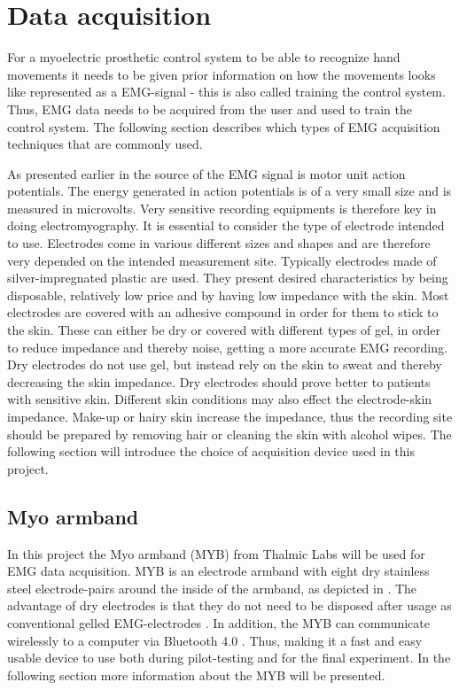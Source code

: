 \section{Data acquisition} \label{sec:BG:dataAcquisition}
For a myoelectric prosthetic control system to be able to recognize hand movements it needs to be given prior information on how the movements looks like represented as a EMG-signal - this is also called training the control system. Thus, EMG data needs to be acquired from the user and used to train the control system. The following section describes which types of EMG acquisition techniques that are commonly used.

As presented earlier in  the source of the EMG signal is motor unit action potentials. The energy generated in action potentials is of a very small size and is measured in microvolts. Very sensitive recording equipments is therefore key in doing electromyography. It is essential to consider the type of electrode intended to use. Electrodes come in various different sizes and shapes and are therefore very depended on the intended measurement site. Typically electrodes made of silver-impregnated plastic are used. They present desired characteristics by being disposable, relatively low price and by having low impedance with the skin. Most electrodes are covered with an adhesive compound in order for them to stick to the skin. These can either be dry or covered with different types of gel, in order to reduce impedance and thereby noise, getting a more accurate EMG recording. Dry electrodes do not use gel, but instead rely on the skin to sweat and thereby decreasing the skin impedance. Dry electrodes should prove better to patients with sensitive skin. Different skin conditions may also effect the electrode-skin impedance. Make-up or hairy skin increase the impedance, thus the recording site should be prepared by removing hair or cleaning the skin with alcohol wipes. \cite{Cram2012} The following section will introduce the choice of acquisition device used in this project.

\subsection{Myo armband} \label{sub:BG:MYB}
In this project the Myo armband (MYB) from Thalmic Labs will be used for EMG data acquisition. MYB is an electrode armband with eight dry stainless steel electrode-pairs around the inside of the armband, as depicted in . The advantage of dry electrodes is that they do not need to be disposed after usage as conventional gelled EMG-electrodes \cite{Cram2012}. In addition, the MYB can communicate wirelessly to a computer via Bluetooth 4.0 \cite{Myoarmband2013}. Thus, making it a fast and easy usable device to use both during pilot-testing and for the final experiment. In the following section more information about the MYB will be presented.

